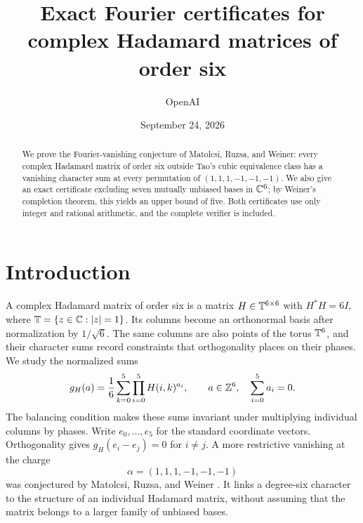 \documentclass[11pt]{article}
\title{Exact Fourier certificates for complex Hadamard matrices of order six}
\author{OpenAI}
\date{September 24, 2026}
\begin{document}
\maketitle

\begin{abstract}
We prove the Fourier-vanishing conjecture of Matolcsi, Ruzsa, and Weiner:
every complex Hadamard matrix of order six outside Tao's cubic equivalence
class has a vanishing character sum at every permutation of
$(1,1,1,-1,-1,-1)$. We also give an exact certificate excluding seven
mutually unbiased bases in $\mathbb C^6$; by Weiner's completion theorem, this
yields an upper bound of five. Both certificates use only integer and
rational arithmetic, and the complete verifier is included.
\end{abstract}

\section{Introduction}\label{sec:introduction}

A complex Hadamard matrix of order six is a matrix
$H\in\mathbb T^{6\times6}$ with $H^*H=6I$, where
$\mathbb T=\{z\in\mathbb C:|z|=1\}$. Its columns become an orthonormal basis after
normalization by $1/\sqrt6$. The same columns are also points of the torus
$\mathbb T^6$, and their character sums record constraints that orthogonality
places on their phases. We study the normalized sums
\begin{equation}\label{eq:g-definition}
 g_H(a)=\frac16\sum_{k=0}^5\prod_{i=0}^5H(i,k)^{a_i},
 \qquad a\in\mathbb Z^6,\quad\sum_{i=0}^5a_i=0.
\end{equation}
The balancing condition makes these sums invariant under multiplying
individual columns by phases. Write $e_0,\ldots,e_5$ for the standard
coordinate vectors. Orthogonality gives
$g_H(e_i-e_j)=0$ for $i\ne j$. A more restrictive vanishing at the charge
\[
 \alpha=(1,1,1,-1,-1,-1)
\]
was conjectured by Matolcsi, Ruzsa, and Weiner
\cite[Conjecture~2.3]{MatolcsiRuzsaWeiner2013}.
It links a degree-six character to the structure of an individual
Hadamard matrix, without assuming that the matrix belongs to a larger
family of unbiased bases.
\end{document}
